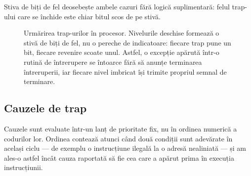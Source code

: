\documentclass[11pt,openany]{report}
\begin{document}
Stiva de biți de fel deosebește ambele cazuri fără logică suplimentară: felul
trap-ului care se închide este chiar bitul scos de pe stivă.

\begin{figure}[H]
\centering
{}
\caption{Urmărirea trap-urilor în procesor. Nivelurile deschise formează o stivă
de biți de fel, nu o pereche de indicatoare: fiecare trap pune un bit, fiecare
revenire scoate unul. Astfel, o excepție apărută într-o rutină de întrerupere se
întoarce fără să anunțe terminarea întreruperii, iar fiecare nivel imbricat își
trimite propriul semnal de terminare.}
\label{fig:trapfsm}
\end{figure}

\subsection{Cauzele de trap}

Cauzele sunt evaluate într-un lanț de prioritate fix, nu în ordinea numerică a
codurilor lor. Ordinea contează atunci când două condiții sunt adevărate în
același ciclu --- de exemplu o instrucțiune ilegală la o adresă nealiniată --- și
am ales-o astfel încât cauza raportată să fie cea care a apărut prima în
execuția instrucțiunii.
\end{document}
